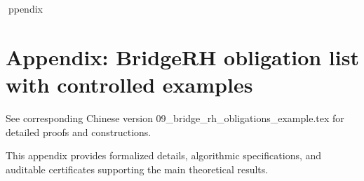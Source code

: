 ppendix

\section*{Appendix: BridgeRH obligation list with controlled examples}

See corresponding Chinese version 09_bridge_rh_obligations_example.tex for detailed proofs and constructions.

This appendix provides formalized details, algorithmic specifications, and auditable certificates supporting the main theoretical results.
